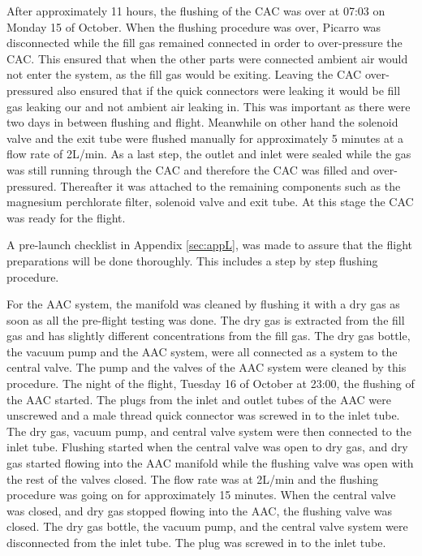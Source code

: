 After approximately 11 hours, the flushing of the CAC was over at 07:03 on Monday 15 of October. When the flushing procedure was over, Picarro was disconnected while the fill gas remained connected in order to over-pressure the CAC. This ensured that when the other parts were connected ambient air would not enter the system, as the fill gas would be exiting. Leaving the CAC over-pressured also ensured that if the quick connectors were leaking it would be fill gas leaking our and not ambient air leaking in. This was important as there were two days in between flushing and flight. Meanwhile on other hand the solenoid valve and the exit tube were flushed manually for approximately 5 minutes at a flow rate of 2L/min. As a last step, the outlet and inlet were sealed while the gas was still running through the CAC and therefore the CAC was filled and over-pressured. Thereafter it was attached to the remaining components such as the magnesium perchlorate filter, solenoid valve and exit tube. At this stage the CAC was ready for the flight. 

A pre-launch checklist in Appendix \ref{sec:appL}, was made to assure that the flight preparations will be done thoroughly. This includes a step by step flushing procedure.

For the AAC system, the manifold was cleaned by flushing it with a dry gas as soon as all the pre-flight testing was done. The dry gas is extracted from the fill gas and has slightly different concentrations from the fill gas. The dry gas bottle, the vacuum pump and the AAC system, were all connected as a system to the central valve. The pump and the valves of the AAC system were cleaned by this procedure. 
The night of the flight, Tuesday 16 of October at 23:00, the flushing of the AAC started. The plugs from the inlet and outlet tubes of the AAC were unscrewed and a male thread quick connector was screwed in to the inlet tube. The dry gas, vacuum pump, and central valve system were then connected to the inlet tube. Flushing started when the central valve was open to dry gas, and dry gas started flowing into the AAC manifold while the flushing valve was open with the rest of the valves closed. The flow rate was at 2L/min and the flushing procedure was going on for approximately 15 minutes. When the central valve was closed, and dry gas stopped flowing into the AAC, the flushing valve was closed. The dry gas bottle, the vacuum pump, and the central valve system were disconnected from the inlet tube. The plug was screwed in to the inlet tube.  

